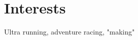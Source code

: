 \documentclass[10pt,letterpaper]{resume}
\begin{document}


\section{Interests}
Ultra running, adventure racing, "making"
\end{document}
